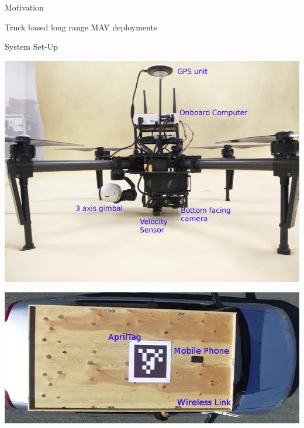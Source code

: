 \begin{frame}{Motivation}
\begin{minipage}[b]{0.45\linewidth}
            Truck based long range MAV deployments
        \end{minipage}
\end{frame}


\begin{frame}{System Set-Up}
        \begin{minipage}[t]{0.45\linewidth}
            \centering
            \includegraphics[width=\textwidth]{figures/m100.jpg}\\
        \end{minipage}
        \hspace{0.5cm}
        \begin{minipage}[t]{0.45\linewidth}
            \centering
            \includegraphics[width=\textwidth]{figures/car.png}\\

\end{minipage}
\end{frame}

